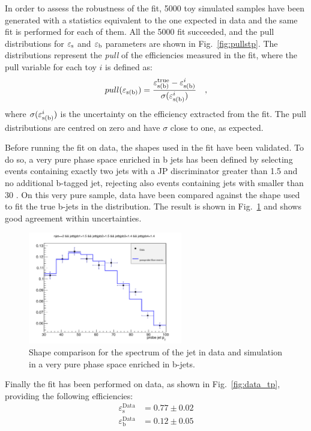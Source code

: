 In order to assess the robustness of the fit, 5000 toy simulated samples have been generated with a statistics equivalent to the one expected in data and the same fit is performed for each of them. All the 5000 fit succeeded, and the pull distributions for $\varepsilon_{\rm s}$ and $\varepsilon_{\rm b}$ parameters are shown in Fig.~\ref{fig:pullstp}. The distributions represent the \emph{pull} of the efficiencies measured in the fit, where the pull variable for each toy $i$ is defined as:
\begin{equation}
pull(\varepsilon_{\rm s (b)}) = \frac{\varepsilon_{\rm s (b)}^{\rm true} - \varepsilon_{\rm s (b)}^{i}}{\sigma(\varepsilon_{\rm s (b)}^{i})} \quad,
\end{equation}
\noindent where $\sigma(\varepsilon_{\rm s (b)}^{i})$ is the uncertainty on the efficiency extracted from the fit. The pull distributions are centred on zero and have $\sigma$ close to one, as expected.

Before running the fit on data, the shapes used in the fit have been validated. To do so, a very pure phase space enriched in b jets has been defined by selecting events containing exactly two jets with a JP discriminator greater than 1.5 and no additional b-tagged jet, rejecting also events containing jets with \pt smaller than 30 \GeV. On this very pure sample, data have been compared against the shape used to fit the true b-jets in the \tpp distribution. The result is shown in Fig.~\ref{fig:purett} and shows good agreement within uncertainties.

\begin{figure}[htb]
\centering
\includegraphics[width=0.6\textwidth]{images/passprobe_data_mc.pdf}
\caption{Shape comparison for the \pt spectrum of the \probe jet in data and simulation in a very pure phase space enriched in b-jets.\label{fig:purett}}
\end{figure}

Finally the fit has been performed on data, as shown in Fig.~\ref{fig:data_tp}, providing the following efficiencies:
\begin{equation}
\begin{split}
\varepsilon_\mathrm{s}^\mathrm{Data} &= 0.77\pm0.02\\
\varepsilon_\mathrm{b}^\mathrm{Data} &= 0.12\pm0.05
\end{split}
\end{equation}

